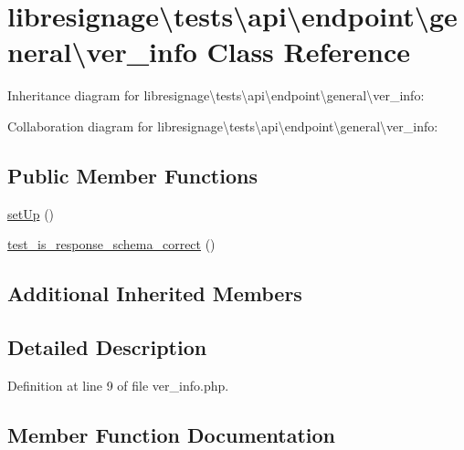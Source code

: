 \hypertarget{classlibresignage_1_1tests_1_1api_1_1endpoint_1_1general_1_1ver__info}{}\section{libresignage\textbackslash{}tests\textbackslash{}api\textbackslash{}endpoint\textbackslash{}general\textbackslash{}ver\+\_\+info Class Reference}
\label{classlibresignage_1_1tests_1_1api_1_1endpoint_1_1general_1_1ver__info}


Inheritance diagram for libresignage\textbackslash{}tests\textbackslash{}api\textbackslash{}endpoint\textbackslash{}general\textbackslash{}ver\+\_\+info\+:


Collaboration diagram for libresignage\textbackslash{}tests\textbackslash{}api\textbackslash{}endpoint\textbackslash{}general\textbackslash{}ver\+\_\+info\+:
\subsection*{Public Member Functions}
\begin{DoxyCompactItemize}
\item 
\hyperlink{classlibresignage_1_1tests_1_1api_1_1endpoint_1_1general_1_1ver__info_a68ab609f4ae9113554a7606b5137917a}{set\+Up} ()
\item 
\hyperlink{classlibresignage_1_1tests_1_1api_1_1endpoint_1_1general_1_1ver__info_af1c904d43dcda78d1de77d07d0729249}{test\+\_\+is\+\_\+response\+\_\+schema\+\_\+correct} ()
\end{DoxyCompactItemize}
\subsection*{Additional Inherited Members}


\subsection{Detailed Description}


Definition at line 9 of file ver\+\_\+info.\+php.



\subsection{Member Function Documentation}
\mbox{\label{classlibresignage_1_1tests_1_1api_1_1endpoint_1_1general_1_1ver__info_a68ab609f4ae9113554a7606b5137917a}} 
